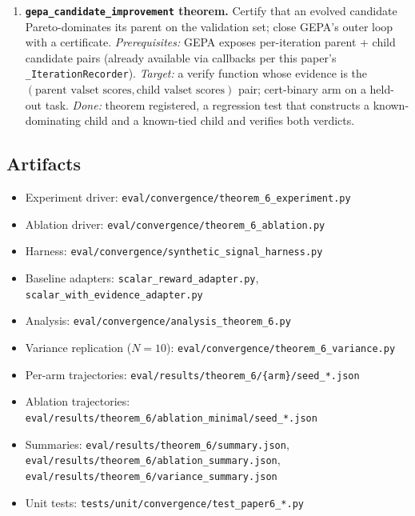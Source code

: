 \begin{enumerate}[leftmargin=*,itemsep=2pt,topsep=2pt]
compile time, no recompile.
\emph{Prerequisites:} stable
\texttt{Certificate.from\_dspy\_compile} entry point (already
shipped 2026-05-01 per memo §2).
\emph{Target:} register the verify function on the theorem
registry and exercise it from a DSPy compile.
\emph{Done:} theorem in
\texttt{operon\_ai/core/certificate.py}, unit test
exercising the round-trip, memo §2 \emph{Status} line updated.
\item \textbf{\texttt{gepa\_candidate\_improvement} theorem.}
Certify that an evolved candidate Pareto-dominates its parent on
the validation set; close GEPA's outer loop with a certificate.
\emph{Prerequisites:} GEPA exposes per-iteration parent +
child candidate pairs (already available via callbacks per this
paper's \texttt{\_IterationRecorder}).
\emph{Target:} a verify function whose evidence is the
$(\text{parent valset scores}, \text{child valset scores})$
pair; cert-binary arm on a held-out task.
\emph{Done:} theorem registered, a regression
test that constructs a known-dominating child and a known-tied
child and verifies both verdicts.
\end{enumerate}

\subsection{Artifacts}

\begin{itemize}[leftmargin=*,itemsep=2pt,topsep=2pt]
\item Experiment driver:
\texttt{eval/convergence/theorem\_6\_experiment.py}
\item Ablation driver:
\texttt{eval/convergence/theorem\_6\_ablation.py}
\item Harness:
\texttt{eval/convergence/synthetic\_signal\_harness.py}
\item Baseline adapters:
\texttt{scalar\_reward\_adapter.py},
\texttt{scalar\_with\_evidence\_adapter.py}
\item Analysis:
\texttt{eval/convergence/analysis\_theorem\_6.py}
\item Variance replication ($N=10$):
\texttt{eval/convergence/theorem\_6\_variance.py}
\item Per-arm trajectories:
\texttt{eval/results/theorem\_6/\{arm\}/seed\_*.json}
\item Ablation trajectories:
\texttt{eval/results/theorem\_6/ablation\_minimal/seed\_*.json}
\item Summaries:
\texttt{eval/results/theorem\_6/summary.json},
\texttt{eval/results/theorem\_6/ablation\_summary.json},
\texttt{eval/results/theorem\_6/variance\_summary.json}
\item Unit tests:
\texttt{tests/unit/convergence/test\_paper6\_*.py}
\end{itemize}

